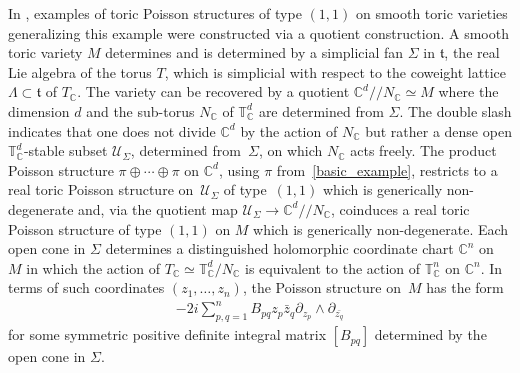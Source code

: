 \documentclass[10pt,a4paper]{amsart}
\numberwithin{equation}{section}
\begin{document}
In \cite{Caine}, examples of toric Poisson structures of type $(1,1)$ on smooth toric varieties generalizing this example were constructed via a quotient construction. A smooth toric variety $M$ determines and is determined by a simplicial fan $\Sigma$ in ${\mathfrak t}$, the real Lie algebra of the torus $T$, which is simplicial with respect to the coweight lattice $\Lambda\subset{\mathfrak t}$ of $T_{\mathbb C}$. The variety can be recovered by a quotient ${\mathbb C}^d//N_{\mathbb C}\simeq M$ where the dimension $d$ and the sub-torus $N_{\mathbb C}$ of ${\mathbb T}_{\mathbb C}^d$ are determined from $\Sigma$. The double slash indicates that one does not divide ${\mathbb C}^d$ by the action of $N_{\mathbb C}$ but rather a dense open ${\mathbb T}_{\mathbb C}^d$-stable subset $\mathcal U_\Sigma$, determined from~$\Sigma$, on which $N_{\mathbb C}$ acts freely. The product Poisson structure $\pi\oplus \cdots \oplus \pi$ on ${\mathbb C}^d$, using $\pi$ from~\eqref{basic_example}, restricts to a real toric Poisson structure on~$\mathcal U_\Sigma$ of type~$(1,1)$ which is generically non-degenerate and, via the quotient map $\mathcal U_\Sigma\to {\mathbb C}^d//N_{\mathbb C}$, coinduces a real toric Poisson structure of type $(1,1)$ on $M$ which is generically non-degenerate. Each open cone in $\Sigma$ determines a distinguished holomorphic coordinate chart ${\mathbb C}^n$ on $M$ in which the action of $T_{\mathbb C}\simeq {\mathbb T}_{\mathbb C}^d/N_{\mathbb C}$ is equivalent to the action of ${\mathbb T}_{\mathbb C}^n$ on ${\mathbb C}^n$. In terms of such coordinates $(z_1,\dots,z_n)$, the Poisson structure on~$M$ has the form
\begin{gather}\label{model_for_toric_PS}
-2i\sum_{p,q=1}^n B_{pq}z_p\bar{z}_q\partial_{z_p}\wedge\partial_{\bar{z_q}}
\end{gather}
for some symmetric positive def\/inite integral matrix $[B_{pq}]$ determined by the open cone in $\Sigma$.
\end{document}
